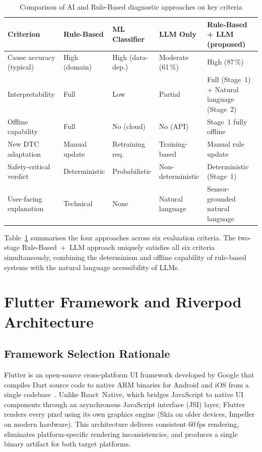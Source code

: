 \begin{table}[!htbp]
\centering
\caption{Comparison of AI and Rule-Based diagnostic approaches on key criteria}
\label{tab:aicomparison}
\begin{tabularx}{0.98\linewidth}{p{3.6cm} p{2.0cm} p{2.0cm} p{2.0cm} X}
\toprule
\rowcolor{tblhdr}
\color{white}\textbf{Criterion} &
\color{white}\textbf{Rule-Based} &
\color{white}\textbf{ML Classifier} &
\color{white}\textbf{LLM Only} &
\color{white}\textbf{Rule-Based + LLM (proposed)} \\
\midrule
Cause accuracy (typical) & High (domain) & High (data-dep.) & Moderate (61\,\%) & High (87\,\%) \\
Interpretability         & Full          & Low              & Partial           & Full (Stage~1) + Natural language (Stage~2) \\
Offline capability       & Full          & No (cloud)       & No (API)          & Stage~1 fully offline \\
New DTC adaptation       & Manual update & Retraining req.  & Training-based    & Manual rule update \\
Safety-critical verdict  & Deterministic & Probabilistic    & Non-deterministic & Deterministic (Stage~1) \\
User-facing explanation  & Technical     & None             & Natural language  & Sensor-grounded natural language \\
\bottomrule
\end{tabularx}
\end{table}

Table~\ref{tab:aicomparison} summarises the four approaches across six evaluation criteria.
The two-stage Rule-Based~+~LLM approach uniquely satisfies all six criteria simultaneously, combining the determinism and offline capability of rule-based systems with the natural language accessibility of LLMs.

\section{Flutter Framework and Riverpod Architecture}
\label{sec:flutter}

\subsection{Framework Selection Rationale}

Flutter is an open-source cross-platform UI framework developed by Google that compiles Dart source code to native ARM binaries for Android and iOS from a single codebase~\cite{flutter2024}.
Unlike React~Native, which bridges JavaScript to native UI components through an asynchronous JavaScript interface (JSI) layer, Flutter renders every pixel using its own graphics engine (Skia on older devices, Impeller on modern hardware).
This architecture delivers consistent 60\,fps rendering, eliminates platform-specific rendering inconsistencies, and produces a single binary artifact for both target platforms.

